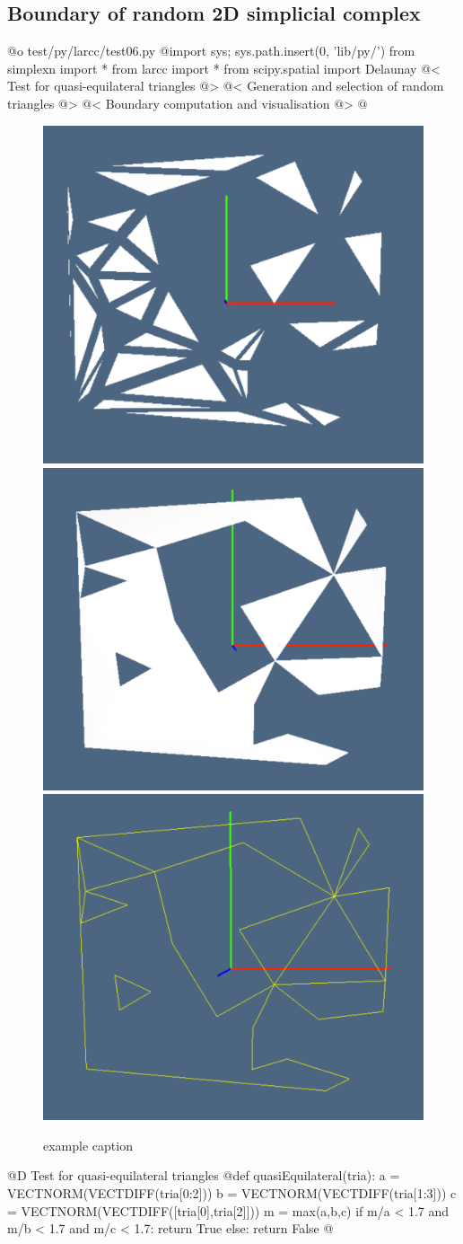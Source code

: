 \documentclass[11pt,oneside]{article}	%
\begin{document}
\subsection{Boundary of random 2D simplicial complex}

@o test/py/larcc/test06.py
@{import sys; sys.path.insert(0, 'lib/py/')
from simplexn import *
from larcc import *
from scipy.spatial import Delaunay
@< Test for quasi-equilateral triangles @>
@< Generation and selection of random triangles @>
@< Boundary computation and visualisation @>
@}


\begin{figure}[htbp] %
   \centering
   \includegraphics[height=0.25\linewidth,width=0.32\linewidth]{images/tria0} 
   \includegraphics[height=0.25\linewidth,width=0.32\linewidth]{images/tria1} 
   \includegraphics[height=0.25\linewidth,width=0.32\linewidth]{images/tria2} 
   \caption{example caption}
   \label{fig:example}
\end{figure}

@D Test for quasi-equilateral triangles
@{def quasiEquilateral(tria):
	a = VECTNORM(VECTDIFF(tria[0:2]))
	b = VECTNORM(VECTDIFF(tria[1:3]))
	c = VECTNORM(VECTDIFF([tria[0],tria[2]]))
	m = max(a,b,c)
	if m/a < 1.7 and m/b < 1.7 and m/c < 1.7: return True
	else: return False
@}
\end{document}

